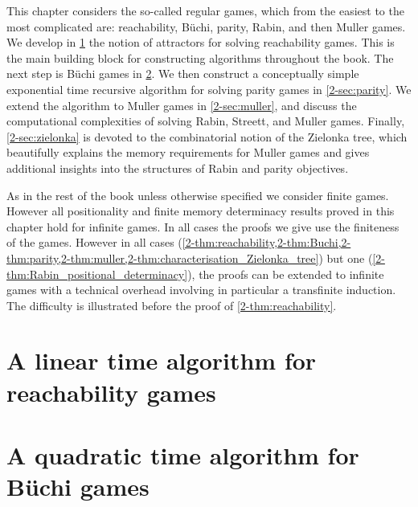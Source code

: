 

This chapter considers the so-called regular games, which from the easiest to the most complicated are: reachability, B{\"u}chi,
parity, Rabin, and then Muller games.
We develop in \cref{2-sec:attractors} the notion of attractors for solving reachability games. 
This is the main building block for constructing algorithms throughout the book.
The next step is B{\"u}chi games in \cref{2-sec:buchi}. 
We then construct a conceptually simple exponential time recursive algorithm for solving parity games in \cref{2-sec:parity}.
We extend the algorithm to Muller games in \cref{2-sec:muller}, and discuss the computational complexities of solving Rabin, Streett, and Muller games.
Finally, \cref{2-sec:zielonka} is devoted to the combinatorial notion of the Zielonka tree, 
which beautifully explains the memory requirements for Muller games and gives additional insights into the structures of Rabin and parity objectives.

\begin{remark}
\label{2-rmk:finite_infinite}
As in the rest of the book unless otherwise specified we consider finite games.
However all positionality and finite memory determinacy results proved in this chapter hold for infinite games.
In all cases the proofs we give use the finiteness of the games.
However in all cases (\cref{2-thm:reachability,2-thm:Buchi,2-thm:parity,2-thm:muller,2-thm:characterisation_Zielonka_tree}) 
but one (\cref{2-thm:Rabin_positional_determinacy}),
the proofs can be extended to infinite games with a technical overhead involving in particular a transfinite induction.
The difficulty is illustrated before the proof of \cref{2-thm:reachability}.
\end{remark}


\section{A linear time algorithm for reachability games}
\label{2-sec:attractors}



\section{A quadratic time algorithm for B{\"u}chi games}
\label{2-sec:buchi}


